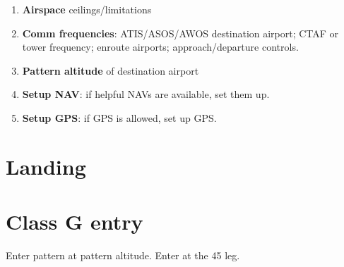 \documentclass[article,9pt,landscape]{memoir}
\begin{document}
\begin{multicols*}{4}
\begin{enumerate}
    \item \textbf{Airspace} ceilings/limitations

    \item \textbf{Comm frequencies}: ATIS/ASOS/AWOS destination
      airport; CTAF or tower frequency; enroute airports;
      approach/departure controls.

    \item \textbf{Pattern altitude} of destination airport

    \item \textbf{Setup NAV}: if helpful NAVs are available, set them up.

    \item \textbf{Setup GPS}: if GPS is allowed, set up GPS.
  \end{enumerate}
  \chapter{Landing}
  \chapter{Class G entry}
  Enter pattern at pattern altitude.  Enter at the 45 leg.

  

\end{multicols*}
\end{document}
